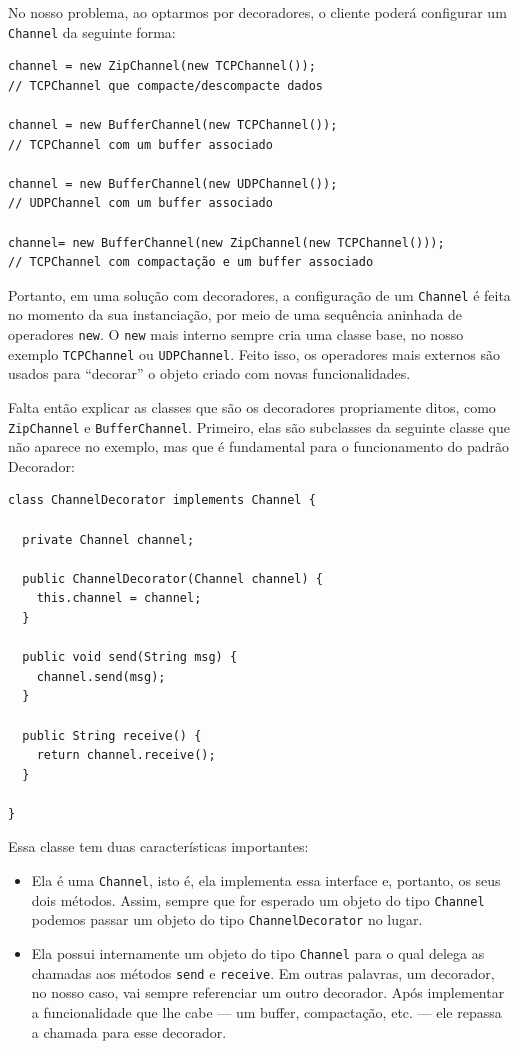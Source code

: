 \documentclass[
  11pt,
  twoside]{book}
\newcommand{\passthrough}[1]{#1}
\begin{document}
No nosso problema, ao optarmos por decoradores, o cliente poderá
configurar um \passthrough{\lstinline!Channel!} da seguinte forma:

\begin{lstlisting}
channel = new ZipChannel(new TCPChannel());
// TCPChannel que compacte/descompacte dados 

channel = new BufferChannel(new TCPChannel());
// TCPChannel com um buffer associado

channel = new BufferChannel(new UDPChannel());
// UDPChannel com um buffer associado

channel= new BufferChannel(new ZipChannel(new TCPChannel()));
// TCPChannel com compactação e um buffer associado
\end{lstlisting}

Portanto, em uma solução com decoradores, a configuração de um
\passthrough{\lstinline!Channel!} é feita no momento da sua
instanciação, por meio de uma sequência aninhada de operadores
\passthrough{\lstinline!new!}. O \passthrough{\lstinline!new!} mais
interno sempre cria uma classe base, no nosso exemplo
\passthrough{\lstinline!TCPChannel!} ou
\passthrough{\lstinline!UDPChannel!}. Feito isso, os operadores mais
externos são usados para ``decorar'' o objeto criado com novas
funcionalidades.

Falta então explicar as classes que são os decoradores propriamente
ditos, como \passthrough{\lstinline!ZipChannel!} e
\passthrough{\lstinline!BufferChannel!}. Primeiro, elas são subclasses
da seguinte classe que não aparece no exemplo, mas que é fundamental
para o funcionamento do padrão Decorador:

\begin{lstlisting}
class ChannelDecorator implements Channel {

  private Channel channel;

  public ChannelDecorator(Channel channel) {
    this.channel = channel;
  }

  public void send(String msg) {
    channel.send(msg);
  }

  public String receive() {
    return channel.receive();
  }

}
\end{lstlisting}

Essa classe tem duas características importantes:

\begin{itemize}
\item
  Ela é uma \passthrough{\lstinline!Channel!}, isto é, ela implementa
  essa interface e, portanto, os seus dois métodos. Assim, sempre que
  for esperado um objeto do tipo \passthrough{\lstinline!Channel!}
  podemos passar um objeto do tipo
  \passthrough{\lstinline!ChannelDecorator!} no lugar.
\item
  Ela possui internamente um objeto do tipo
  \passthrough{\lstinline!Channel!} para o qual delega as chamadas aos
  métodos \passthrough{\lstinline!send!} e
  \passthrough{\lstinline!receive!}. Em outras palavras, um decorador,
  no nosso caso, vai sempre referenciar um outro decorador. Após
  implementar a funcionalidade que lhe cabe --- um buffer, compactação,
  etc. --- ele repassa a chamada para esse decorador.
\end{itemize}
\end{document}
